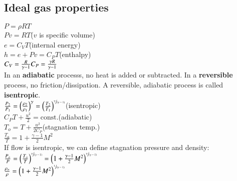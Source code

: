 \subsection*{Ideal gas properties}
$P=\rho RT$\\
$Pv=RT$\hfill($v$ is specific volume)\\
$e=C_VT$\hfill(internal energy)\\
$h=e+Pv=C_PT$\hfill(enthalpy)\\
$C_V=\frac{R}{\gamma-1}\hfill C_P=\frac{\gamma R}{\gamma-1}$\\
In an \textbf{adiabatic} processs, no heat is added or subtracted. In a \textbf{reversible} process, no friction/dissipation. A reversible, adiabatic process is called \textbf{isentropic}.\\
$\frac{P_2}{P_1}=\left(\frac{\rho_2}{\rho_1}\right)^\gamma=\left(\frac{T_2}{T_1}\right)^{\sfrac{\gamma}{(\gamma-1)}}$\hfill(isentropic)\\
$C_PT+\frac{u^2}{2}=\text{const.}$\hfill(adiabatic)\\
$T_o=T+\frac{u^2}{2C_P}$\hfill(stagnation temp.)\\
$\frac{T_o}{T}=1+\frac{\gamma-1}{2}M^2$\\
If flow is isentropic, we can define stagnation pressure and density:\\
$\frac{P_o}{P}=\left(\frac{T_o}{T}\right)^{\sfrac{\gamma}{(\gamma-1)}}=\left(1+\frac{\gamma-1}{2}M^2\right)^{\sfrac{\gamma}{(\gamma-1)}}$\\
$\frac{\rho_o}{\rho}=\left(1+\frac{\gamma-1}{2}M^2\right)^{\sfrac{1}{(\gamma-1)}}$\\
